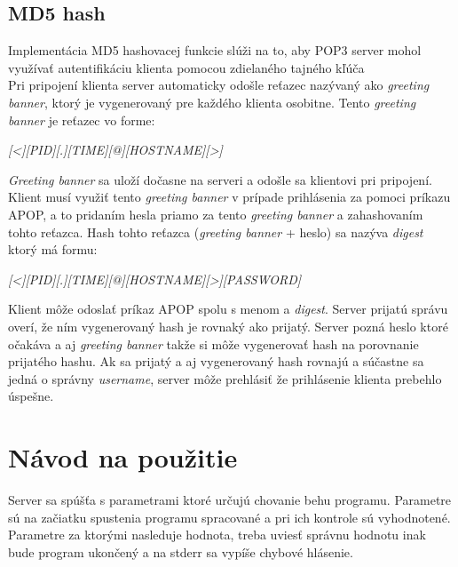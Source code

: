 \documentclass[11pt,a4paper]{article}
\begin{document}
	\subsection{MD5 hash}
		\indent Implementácia MD5 hashovacej funkcie slúži na to, aby POP3 server mohol využívať autentifikáciu klienta pomocou zdielaného tajného kľúča\\[0.4em]
		\indent Pri pripojení klienta server automaticky odošle reťazec nazývaný ako \textit{greeting banner}, ktorý je vygenerovaný pre každého klienta osobitne. Tento \textit{greeting banner} je reťazec vo forme:
		\begin{center}
		\textit{[<][PID][.][TIME][@][HOSTNAME][>]}\\[0.4em]
		\end{center}
		\textit{Greeting banner} sa uloží dočasne na serveri a odošle sa klientovi pri pripojení. Klient musí využiť tento \textit{greeting banner} v prípade prihlásenia za pomoci príkazu APOP, a to pridaním hesla priamo za tento \textit{greeting banner} a zahashovaním tohto reťazca. Hash tohto reťazca (\textit{greeting banner} + heslo) sa nazýva \textit{digest} ktorý má formu:
		\begin{center}
		\textit{[<][PID][.][TIME][@][HOSTNAME][>][PASSWORD]}
		\end{center}
		Klient môže odoslať príkaz APOP spolu s menom a \textit{digest}. Server prijatú správu overí, že ním vygenerovaný hash je rovnaký ako prijatý. Server pozná heslo ktoré očakáva a aj \textit{greeting banner} takže si môže vygenerovať hash na porovnanie prijatého hashu. Ak sa prijatý a aj vygenerovaný hash rovnajú a súčastne sa jedná o správny \textit{username}, server môže prehlásiť že prihlásenie klienta prebehlo úspešne.

\section{Návod na použitie}
	Server sa spúšťa s parametrami ktoré určujú chovanie behu programu. Parametre sú na začiatku spustenia programu spracované a pri ich kontrole sú vyhodnotené. Parametre za ktorými nasleduje hodnota, treba uviesť správnu hodnotu inak bude program ukončený a na stderr sa vypíše chybové hlásenie.\\
\end{document}
